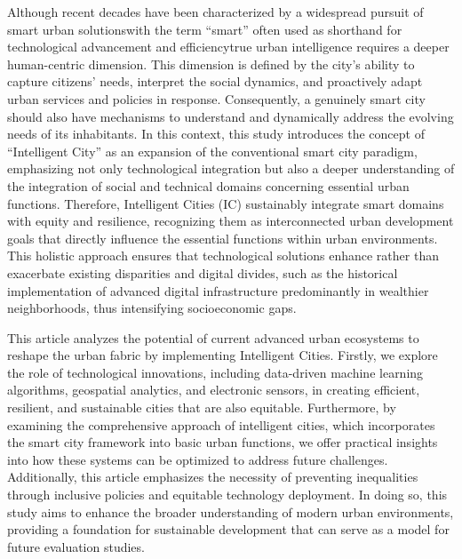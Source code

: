 \documentclass[smartcities,article,submit,pdftex,moreauthors]{Definitions/mdpi}
\begin{document}
Although recent decades have been characterized by a widespread pursuit of smart urban solutions\textemdash with the term ``smart'' often used as shorthand for technological advancement and efficiency\textemdash true urban intelligence requires a deeper human-centric dimension. This dimension is defined by the city's ability to capture citizens' needs, interpret the social dynamics, and proactively adapt urban services and policies in response. Consequently, a genuinely smart city should also have mechanisms to understand and dynamically address the evolving needs of its inhabitants. In this context, this study introduces the concept of ``Intelligent City'' as an expansion of the conventional smart city paradigm, emphasizing not only technological integration but also a deeper understanding of the integration of social and technical domains concerning essential urban functions. Therefore, Intelligent Cities (IC) sustainably integrate smart domains with equity and resilience, recognizing them as interconnected urban development goals that directly influence the essential functions within urban environments. This holistic approach ensures that technological solutions enhance rather than exacerbate existing disparities and digital divides, such as the historical implementation of advanced digital infrastructure predominantly in wealthier neighborhoods, thus intensifying socioeconomic gaps. 

This article analyzes the potential of current advanced urban ecosystems to reshape the urban fabric by implementing Intelligent Cities. Firstly, we explore the role of technological innovations, including data-driven machine learning algorithms, geospatial analytics, and electronic sensors, in creating efficient, resilient, and sustainable cities that are also equitable. Furthermore, by examining the comprehensive approach of intelligent cities, which incorporates the smart city framework into basic urban functions, we offer practical insights into how these systems can be optimized to address future challenges. Additionally, this article emphasizes the necessity of preventing inequalities through inclusive policies and equitable technology deployment. In doing so, this study aims to enhance the broader understanding of modern urban environments, providing a foundation for sustainable development that can serve as a model for future evaluation studies.
\end{document}
